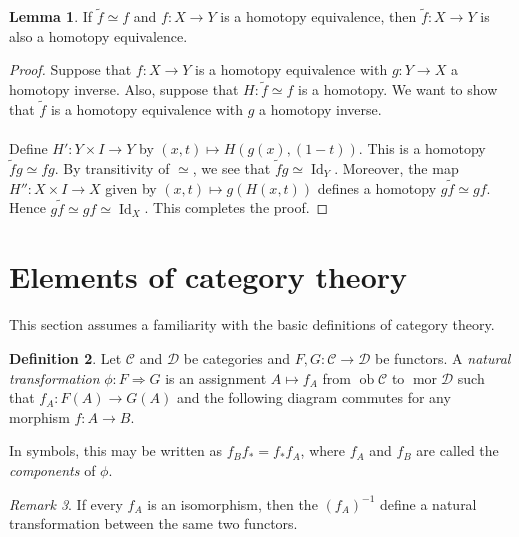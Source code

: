 \documentclass[10pt,letterpaper,cm]{nupset}
\theoremstyle{definition}
\newtheorem{definition}{Definition}[subsection]
\theoremstyle{theorem}
\newtheorem{lemma}[definition]{Lemma}
\theoremstyle{remark}
\newtheorem{remark}[definition]{Remark}
\newcommand{\1}{\mathbf{1}}
\renewcommand{\c}{\mathscr{C}}
\renewcommand{\d}{\mathscr{D}}
\newcommand{\0}{\vec 0}
\DeclareMathOperator{\id}{Id}
\DeclareMathOperator{\ob}{ob}
\DeclareMathOperator{\mor}{mor}
\begin{document}
\begin{lemma}
If $\tilde{f} \simeq f$ and $f: X \to Y$ is a homotopy equivalence, then $\tilde{f} : X \to Y$ is also a homotopy equivalence.
\end{lemma}
\begin{proof}
Suppose that $f: X \to Y$ is a homotopy equivalence with $g: Y \to X$ a homotopy inverse. Also, suppose that $H: \tilde{f} \simeq f$ is a homotopy. We want to show that $\tilde{f}$ is a homotopy equivalence with $g$ a homotopy inverse. 
\\ \\ Define $H' : Y \times I \to Y$ by $(x,t) \mapsto H(g(x), (1-t))$. This is a homotopy $\tilde{f} g \simeq f g$. By transitivity of $\simeq$, we see that $\tilde{f} g  \simeq \id_Y$. Moreover, the map $H'' : X \times I \to X$ given by $(x,t) \mapsto g(H(x,t))$ defines a homotopy $g \tilde{f} \simeq gf$. Hence $g\tilde{f} \simeq gf \simeq \id_X$. This completes the proof.
\end{proof}

\section{Elements of category theory}

This section assumes a familiarity with the basic definitions of category theory.

\begin{definition}
Let $\c$ and $\d$ be categories and $F,G: \c \to \d$ be functors.  A \textit{natural transformation} $\phi :F \Rightarrow G$  is an assignment  $A \mapsto f_A$ from $\ob \c$ to $\mor \d$ such that $f_A : F(A) \to G(A)$ and the following diagram commutes for any morphism $f: A \to B$.

\begin{center}
\end{center}
In symbols, this may be written as $f_Bf_{\ast} = f_{\ast}f_A$, where $f_A$ and $f_B$ are called the \textit{components} of $\phi$.
\end{definition}

\begin{remark}
If every $f_A$ is an isomorphism, then the $(f_A)^{-1}$ define a natural transformation between the same two functors.
\end{remark}
\end{document}
